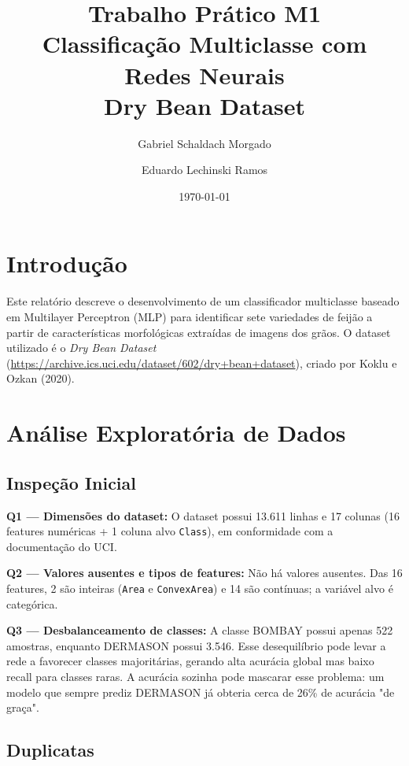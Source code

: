 \documentclass[12pt,a4paper]{article}
\title{\textbf{Trabalho Prático M1}\\
       \large Classificação Multiclasse com Redes Neurais\\
       \normalsize Dry Bean Dataset}
\author{Gabriel Schaldach Morgado \and Eduardo Lechinski Ramos}
\date{\today}
\begin{document}
\maketitle
\tableofcontents
\newpage

\section{Introdução}

Este relatório descreve o desenvolvimento de um classificador multiclasse
baseado em Multilayer Perceptron (MLP) para identificar sete variedades de
feijão a partir de características morfológicas extraídas de imagens dos grãos.
O dataset utilizado é o \textit{Dry Bean Dataset}
(\url{https://archive.ics.uci.edu/dataset/602/dry+bean+dataset}), criado por
Koklu e Ozkan (2020).

\section{Análise Exploratória de Dados}

\subsection{Inspeção Inicial}

\textbf{Q1 — Dimensões do dataset:}
O dataset possui 13.611 linhas e 17 colunas (16 features numéricas + 1 coluna
alvo \texttt{Class}), em conformidade com a documentação do UCI.

\textbf{Q2 — Valores ausentes e tipos de features:}
Não há valores ausentes.  Das 16 features, 2 são inteiras (\texttt{Area} e
\texttt{ConvexArea}) e 14 são contínuas; a variável alvo é categórica.

\textbf{Q3 — Desbalanceamento de classes:}
A classe BOMBAY possui apenas 522 amostras, enquanto DERMASON possui 3.546.
Esse desequilíbrio pode levar a rede a favorecer classes majoritárias,
gerando alta acurácia global mas baixo recall para classes raras.
A acurácia sozinha pode mascarar esse problema: um modelo que sempre prediz
DERMASON já obteria cerca de 26\% de acurácia "de graça".

\subsection{Duplicatas}
\end{document}
